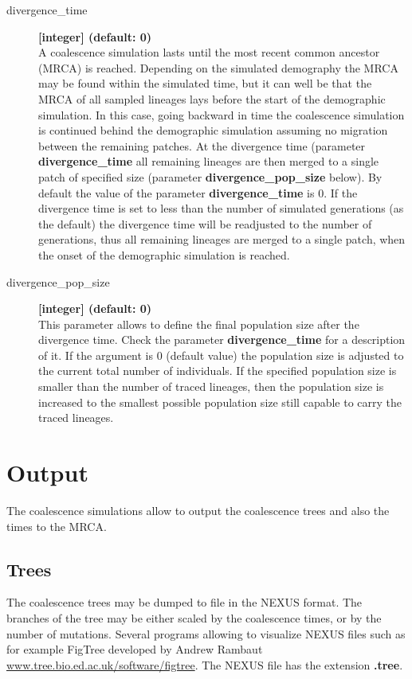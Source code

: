 \documentclass[letterpaper,12pt,oneside]{book}
\begin{document}
\begin{description}
\item[divergence\_time] \textbf{[integer] (default: 0)}\\ 
A coalescence simulation lasts until the most recent common ancestor (MRCA) is reached. Depending on the simulated demography the MRCA may be found within the simulated time, but it can well be that the MRCA of all sampled lineages lays before the start of the demographic simulation. In this case, going backward in time the coalescence simulation is continued behind the demographic simulation assuming no migration between the remaining patches. At the divergence time (parameter \textbf{divergence\_time} all remaining lineages are then merged to a single patch of specified size (parameter \textbf{divergence\_pop\_size} below). By default the value of the parameter \textbf{divergence\_time} is 0. If the divergence time is set to less than the number of simulated generations (as the default) the divergence time will be readjusted to the number of generations, thus all remaining lineages are merged to a single patch, when the onset of the demographic simulation is reached. 

\item[divergence\_pop\_size] \textbf{[integer] (default: 0)}\\ 
This parameter allows to define the final population size after the divergence time. Check the parameter \textbf{divergence\_time} for a description of it. If the argument is 0 (default value) the population size is adjusted to the current total number of individuals. If the specified population size is smaller than the number of traced lineages, then the population size is increased to the smallest possible population size still capable to carry the traced lineages. 
\end{description} 
 

\section{Output}
The coalescence simulations allow to output the coalescence trees and also the times to the MRCA.

\subsection{Trees}\label{coalTrees}
The coalescence trees may be dumped to file in the NEXUS format. The branches of the tree may be either scaled by the coalescence times, or by the number of mutations. Several programs allowing to visualize NEXUS files such as for example FigTree developed by Andrew Rambaut \url{www.tree.bio.ed.ac.uk/software/figtree}. The NEXUS file has the extension \textbf{.tree}.
\end{document}
